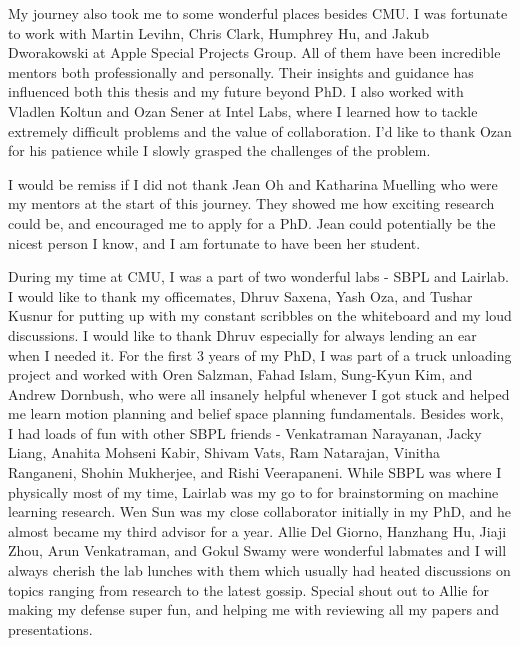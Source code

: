\documentclass[11pt]{cmuthesis}
\begin{document}
\begin{acknowledgments}
  My journey also took me to some wonderful places besides CMU. I was
  fortunate to work with Martin Levihn, Chris Clark, Humphrey Hu, and
  Jakub Dworakowski at Apple Special Projects Group. All of them have
  been incredible mentors both professionally and personally. Their
  insights and guidance has influenced both this thesis and my future
  beyond PhD. I also worked with Vladlen Koltun and Ozan Sener at
  Intel Labs, where I learned how to tackle extremely difficult
  problems and the value of collaboration. I'd like to thank Ozan for
  his patience while I slowly grasped the
  challenges of the problem.

  I would be remiss if I did not thank Jean Oh and Katharina Muelling
  who were my mentors at the start of this journey. They showed me how
  exciting research could be, and encouraged me to apply for a
  PhD. Jean could potentially be the nicest person I know, and I am
  fortunate to have been her student.

  During my time at CMU, I was a part of two wonderful labs - SBPL and
  Lairlab. I would like to thank my officemates, Dhruv Saxena, Yash Oza, and
  Tushar Kusnur for putting up with my constant scribbles on the whiteboard
  and my loud discussions. I would like to thank Dhruv especially for
  always lending an ear when I needed it. For the first 3 years of my
  PhD, I was part of a truck unloading project and worked with Oren
  Salzman, Fahad Islam,
  Sung-Kyun Kim, and Andrew Dornbush, who were all insanely helpful whenever I got stuck
  and helped me learn motion planning and belief space planning
  fundamentals. Besides work, I had loads of fun with other SBPL
  friends - Venkatraman Narayanan, Jacky Liang, Anahita Mohseni Kabir,
  Shivam Vats, Ram Natarajan, Vinitha Ranganeni, Shohin Mukherjee, and
  Rishi Veerapaneni. While SBPL was where I physically most of my time, Lairlab
  was my go to for brainstorming on machine learning research. Wen Sun
  was my close collaborator initially in my PhD, and he almost became
  my third advisor for a year. Allie Del Giorno, Hanzhang Hu, Jiaji
  Zhou, Arun Venkatraman, and Gokul Swamy
  were wonderful labmates and I will always cherish the lab lunches
  with them which usually had heated discussions on topics ranging
  from research to the latest gossip. Special shout out to Allie for
  making my defense super fun, and helping me with reviewing all my
  papers and presentations. 


\end{acknowledgments}
\end{document}

